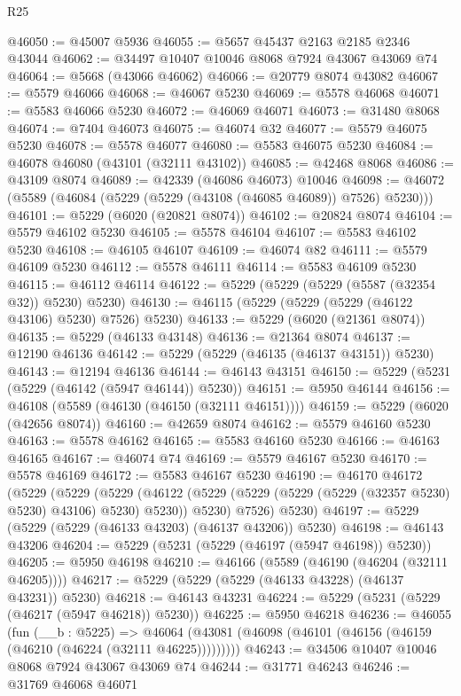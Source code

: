 \begin{lexlean}{R25}
\begin{coremodule}
@46050 := @45007 @5936
@46055 := @5657 @45437 @2163 @2185 @2346 @43044
@46062 := @34497 @10407 @10046 @8068 @7924 @43067 @43069 @74
@46064 := @5668 (@43066 @46062)
@46066 := @20779 @8074 @43082
@46067 := @5579 @46066
@46068 := @46067 @5230
@46069 := @5578 @46068
@46071 := @5583 @46066 @5230
@46072 := @46069 @46071
@46073 := @31480 @8068
@46074 := @7404 @46073
@46075 := @46074 @32
@46077 := @5579 @46075 @5230
@46078 := @5578 @46077
@46080 := @5583 @46075 @5230
@46084 := @46078 @46080 (@43101 (@32111 @43102))
@46085 := @42468 @8068
@46086 := @43109 @8074
@46089 := @42339 (@46086 @46073) @10046
@46098 := @46072 (@5589 (@46084 (@5229 (@5229 (@43108 (@46085 @46089)) @7526) @5230)))
@46101 := @5229 (@6020 (@20821 @8074))
@46102 := @20824 @8074
@46104 := @5579 @46102 @5230
@46105 := @5578 @46104
@46107 := @5583 @46102 @5230
@46108 := @46105 @46107
@46109 := @46074 @82
@46111 := @5579 @46109 @5230
@46112 := @5578 @46111
@46114 := @5583 @46109 @5230
@46115 := @46112 @46114
@46122 := @5229 (@5229 (@5229 (@5587 (@32354 @32)) @5230) @5230)
@46130 := @46115 (@5229 (@5229 (@5229 (@46122 @43106) @5230) @7526) @5230)
@46133 := @5229 (@6020 (@21361 @8074))
@46135 := @5229 (@46133 @43148)
@46136 := @21364 @8074
@46137 := @12190 @46136
@46142 := @5229 (@5229 (@46135 (@46137 @43151)) @5230)
@46143 := @12194 @46136
@46144 := @46143 @43151
@46150 := @5229 (@5231 (@5229 (@46142 (@5947 @46144)) @5230))
@46151 := @5950 @46144
@46156 := @46108 (@5589 (@46130 (@46150 (@32111 @46151))))
@46159 := @5229 (@6020 (@42656 @8074))
@46160 := @42659 @8074
@46162 := @5579 @46160 @5230
@46163 := @5578 @46162
@46165 := @5583 @46160 @5230
@46166 := @46163 @46165
@46167 := @46074 @74
@46169 := @5579 @46167 @5230
@46170 := @5578 @46169
@46172 := @5583 @46167 @5230
@46190 := @46170
    @46172
    (@5229
      (@5229
        (@5229
          (@46122 (@5229 (@5229 (@5229 (@5229 (@32357 @5230) @5230) @43106) @5230) @5230))
          @5230)
        @7526)
      @5230)
@46197 := @5229 (@5229 (@5229 (@46133 @43203) (@46137 @43206)) @5230)
@46198 := @46143 @43206
@46204 := @5229 (@5231 (@5229 (@46197 (@5947 @46198)) @5230))
@46205 := @5950 @46198
@46210 := @46166 (@5589 (@46190 (@46204 (@32111 @46205))))
@46217 := @5229 (@5229 (@5229 (@46133 @43228) (@46137 @43231)) @5230)
@46218 := @46143 @43231
@46224 := @5229 (@5231 (@5229 (@46217 (@5947 @46218)) @5230))
@46225 := @5950 @46218
@46236 := @46055
    (fun (__b : @5225) =>
    @46064 (@43081 (@46098 (@46101 (@46156 (@46159 (@46210 (@46224 (@32111 @46225)))))))))
@46243 := @34506 @10407 @10046 @8068 @7924 @43067 @43069 @74
@46244 := @31771 @46243
@46246 := @31769 @46068 @46071

\end{coremodule}
\end{lexlean}
